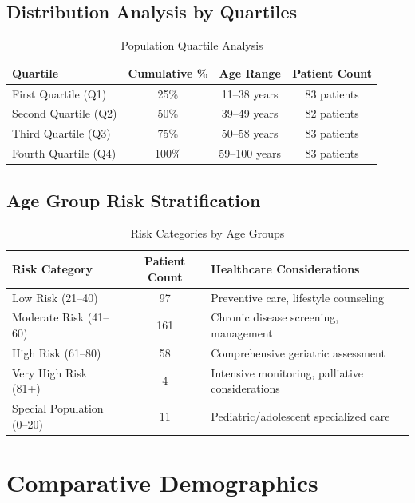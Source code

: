 \documentclass[10pt]{article}
\begin{document}
\subsection{Distribution Analysis by Quartiles}

\begin{table}[h!]
\centering
\caption{Population Quartile Analysis}
\begin{tabular}{l|c|c|c}
\toprule
\rowcolor{headercolor}
\textbf{Quartile} & \textbf{Cumulative \%} & \textbf{Age Range} & \textbf{Patient Count} \\
\midrule
First Quartile (Q1) & 25\% & 11--38 years & 83 patients \\
\rowcolor{altrowcolor}
Second Quartile (Q2) & 50\% & 39--49 years & 82 patients \\
Third Quartile (Q3) & 75\% & 50--58 years & 83 patients \\
\rowcolor{altrowcolor}
Fourth Quartile (Q4) & 100\% & 59--100 years & 83 patients \\
\bottomrule
\end{tabular}
\end{table}

\subsection{Age Group Risk Stratification}

\begin{table}[h!]
\centering
\caption{Risk Categories by Age Groups}
\begin{tabular}{l|c|l}
\toprule
\rowcolor{headercolor}
\textbf{Risk Category} & \textbf{Patient Count} & \textbf{Healthcare Considerations} \\
\midrule
Low Risk (21--40) & 97 & Preventive care, lifestyle counseling \\
\rowcolor{altrowcolor}
Moderate Risk (41--60) & 161 & Chronic disease screening, management \\
High Risk (61--80) & 58 & Comprehensive geriatric assessment \\
\rowcolor{altrowcolor}
Very High Risk (81+) & 4 & Intensive monitoring, palliative considerations \\
Special Population (0--20) & 11 & Pediatric/adolescent specialized care \\
\bottomrule
\end{tabular}
\end{table}

\section{Comparative Demographics}
\end{document}
